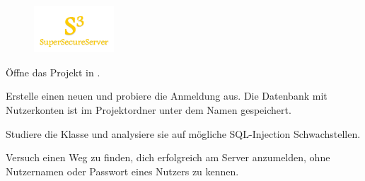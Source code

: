 \documentclass[10pt, a4paper, ngerman]{arbeitsblatt}
\begin{document}
\begin{aufgabe}[icon=\iconPartner\,\iconLaptop]
	\begin{figure}
	\includegraphics[width=3cm]{Q2-AB.06-ABB_S3-Logo.png}
	\end{figure}
	Öffne das Projekt  in .


	\begin{teilaufgaben}
		\teilaufgabe
		Erstelle einen neuen  und probiere die Anmeldung aus. Die Datenbank mit Nutzerkonten ist im Projektordner unter dem Namen  gespeichert.

		\teilaufgabe
		Studiere die Klasse  und analysiere sie auf mögliche SQL-Injection Schwachstellen.

		\teilaufgabe
		Versuch einen Weg zu finden, dich erfolgreich am Server anzumelden, ohne Nutzernamen oder Passwort eines Nutzers zu kennen.
	\end{teilaufgaben}
\end{aufgabe}
\end{document}
